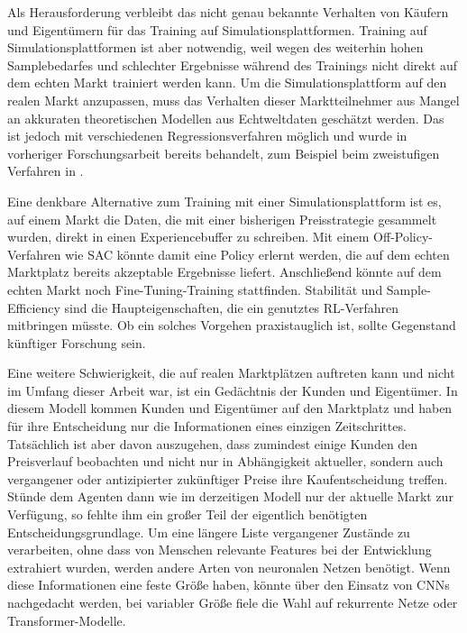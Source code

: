 Als Herausforderung verbleibt das nicht genau bekannte Verhalten von Käufern und Eigentümern für das Training auf Simulationsplattformen.
Training auf Simulationsplattformen ist aber notwendig, weil wegen des weiterhin hohen Samplebedarfes und schlechter Ergebnisse während des Trainings nicht direkt auf dem echten Markt trainiert werden kann.
Um die Simulationsplattform auf den realen Markt anzupassen, muss das Verhalten dieser Marktteilnehmer aus Mangel an akkuraten theoretischen Modellen aus Echtweltdaten geschätzt werden.
Das ist jedoch mit verschiedenen Regressionsverfahren möglich und wurde in vorheriger Forschungsarbeit bereits behandelt, zum Beispiel beim zweistufigen Verfahren in \cite{10.1145/3219819.3219833}.

Eine denkbare Alternative zum Training mit einer Simulationsplattform ist es, auf einem Markt die Daten, die mit einer bisherigen Preisstrategie gesammelt wurden, direkt in einen Experiencebuffer zu schreiben.
Mit einem Off-Policy-Verfahren wie SAC könnte damit eine Policy erlernt werden, die auf dem echten Marktplatz bereits akzeptable Ergebnisse liefert.
Anschließend könnte auf dem echten Markt noch Fine-Tuning-Training stattfinden.
Stabilität und Sample-Efficiency sind die Haupteigenschaften, die ein genutztes RL-Verfahren mitbringen müsste.
Ob ein solches Vorgehen praxistauglich ist, sollte Gegenstand künftiger Forschung sein.

Eine weitere Schwierigkeit, die auf realen Marktplätzen auftreten kann und nicht im Umfang dieser Arbeit war, ist ein Gedächtnis der Kunden und Eigentümer.
In diesem Modell kommen Kunden und Eigentümer auf den Marktplatz und haben für ihre Entscheidung nur die Informationen eines einzigen Zeitschrittes.
Tatsächlich ist aber davon auszugehen, dass zumindest einige Kunden den Preisverlauf beobachten und nicht nur in Abhängigkeit aktueller, sondern auch vergangener oder antizipierter zukünftiger Preise ihre Kaufentscheidung treffen.
Stünde dem Agenten dann wie im derzeitigen Modell nur der aktuelle Markt zur Verfügung, so fehlte ihm ein großer Teil der eigentlich benötigten Entscheidungsgrundlage.
Um eine längere Liste vergangener Zustände zu verarbeiten, ohne dass von Menschen relevante Features bei der Entwicklung extrahiert wurden, werden andere Arten von neuronalen Netzen benötigt.
Wenn diese Informationen eine feste Größe haben, könnte über den Einsatz von CNNs nachgedacht werden, bei variabler Größe fiele die Wahl auf rekurrente Netze oder Transformer-Modelle.
